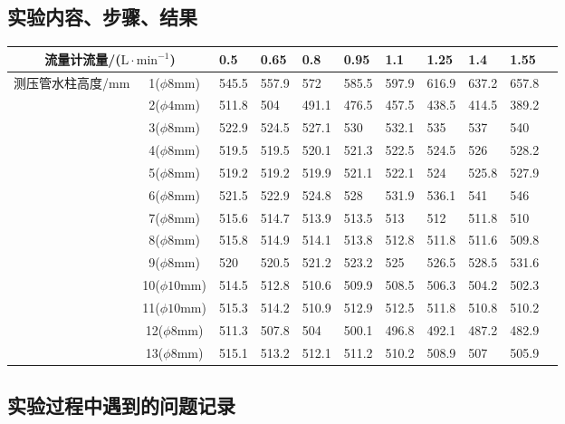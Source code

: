 \documentclass[dvipsnames, svgnames,a4paper,11pt]{article}
\begin{document}
\subsection{实验内容、步骤、结果}
\begin{table}[!h]
	\renewcommand\arraystretch{1.7}
	\centering
	\begin{tabularx}{\textwidth}{|c|c|X|X|X|X|X|X|X|X|X|}
	\hline
	\multicolumn{2}{|c|}{流量计流量/($\text{L}\cdot\text{min}^{-1}$)} & 0.5 & 0.65 & 0.8 & 0.95 & 1.1 & 1.25 & 1.4 & 1.55 \\ \hline
	\multirow{13}{*}{测压管水柱高度/mm} & 1($\phi 8\text{mm}$)& 545.5 & 557.9 & 572 & 585.5 & 597.9 & 616.9 & 637.2 & 657.8 \\ \cline{2-10}
	& 2($\phi 4\text{mm}$) & 511.8 & 504 & 491.1 & 476.5 & 457.5 & 438.5 & 414.5 & 389.2 \\ \cline{2-10}
	& 3($\phi 8\text{mm}$) & 522.9 & 524.5 & 527.1 & 530 & 532.1 & 535 & 537 & 540 \\ \cline{2-10}
	& 4($\phi 8\text{mm}$) & 519.5 & 519.5 & 520.1 & 521.3 & 522.5 & 524.5 & 526 & 528.2 \\ \cline{2-10}
	& 5($\phi 8\text{mm}$) & 519.2 & 519.2 & 519.9 & 521.1 & 522.1 & 524 & 525.8 & 527.9 \\ \cline{2-10}
	& 6($\phi 8\text{mm}$) & 521.5 & 522.9 & 524.8 & 528 & 531.9 & 536.1 & 541 & 546 \\ \cline{2-10}
	& 7($\phi 8\text{mm}$) & 515.6 & 514.7 & 513.9 & 513.5 & 513 & 512 & 511.8 & 510 \\ \cline{2-10}
	& 8($\phi 8\text{mm}$) & 515.8 & 514.9 & 514.1 & 513.8 & 512.8 & 511.8 & 511.6 & 509.8 \\ \cline{2-10}
	& 9($\phi 8\text{mm}$) & 520 & 520.5 & 521.2 & 523.2 & 525 & 526.5 & 528.5 & 531.6 \\ \cline{2-10}
	& 10($\phi 10\text{mm}$) & 514.5 & 512.8 & 510.6 & 509.9 & 508.5 & 506.3 & 504.2 & 502.3 \\ \cline{2-10}
	& 11($\phi 10\text{mm}$) & 515.3 & 514.2 & 510.9 & 512.9 & 512.5 & 511.8 & 510.8 & 510.2 \\ \cline{2-10}
	& 12($\phi 8\text{mm}$) & 511.3 & 507.8 & 504 & 500.1 & 496.8 & 492.1 & 487.2 & 482.9 \\ \cline{2-10}
	& 13($\phi 8\text{mm}$) & 515.1 & 513.2 & 512.1 & 511.2 & 510.2 & 508.9 & 507 & 505.9 \\ \hline
	\end{tabularx}
\end{table}

\subsection{实验过程中遇到的问题记录}
\end{document}
